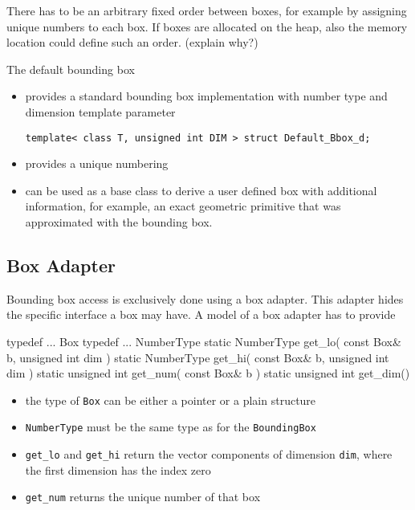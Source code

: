 There has to be an arbitrary fixed order between boxes, for example by
assigning unique numbers to each box. If boxes are allocated on the
heap, also the memory location could define such an order. (explain
why?)

The default bounding box
\begin{itemize} 
  \item  provides a standard bounding box implementation with number type and
  dimension template parameter

  \texttt{template< class T, unsigned int DIM > struct Default\_Bbox\_d;}
  \item provides a unique numbering
  \item can be used as a base class to derive a user defined box with
  additional information, for example, an exact geometric primitive
  that was approximated with the bounding box.
\end{itemize}


\subsection*{Box Adapter}
Bounding box access is exclusively done using a box adapter. This adapter hides the specific interface a box may have. A model of a box adapter has to provide
\begin{ccExampleCode}
  typedef ... Box
  typedef ... NumberType
  static NumberType get_lo( const Box& b, unsigned int dim )
  static NumberType get_hi( const Box& b, unsigned int dim )
  static unsigned int get_num( const Box& b )
  static unsigned int get_dim()
\end{ccExampleCode}

\begin{itemize}
 \item the type of \texttt{Box} can be either a pointer or a plain structure
 \item \texttt{NumberType} must be the same type as for the
 \texttt{BoundingBox} 
 \item \texttt{get\_lo} and \texttt{get\_hi} return the vector
 components of dimension \texttt{dim}, where the first  dimension has
 the index zero 
 \item \texttt{get\_num} returns the unique number of that box
\end{itemize}

